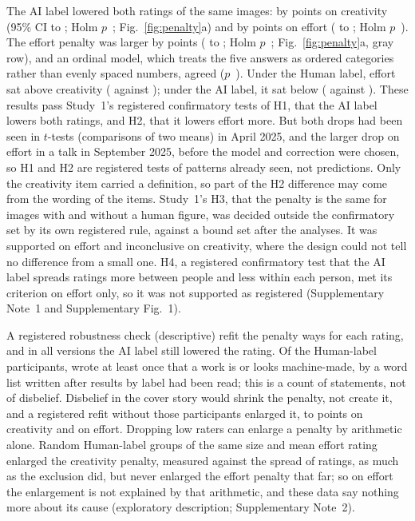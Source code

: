 The AI label lowered both ratings of the same images: by \SOneHOneCreatDiff{} points on creativity (95\% CI \SOneHOneCreatLo{} to \SOneHOneCreatHi; Holm $p$~\SOneHOneCreatPHolm; Fig.~\ref{fig:penalty}a) and by \SOneHOneEffDiff{} points on effort (\SOneHOneEffLo{} to \SOneHOneEffHi; Holm $p$~\SOneHOneEffPHolm). The effort penalty was larger by \SOneHTwoDiff{} points (\SOneHTwoLo{} to \SOneHTwoHi; Holm $p$~\SOneHTwoPHolm; Fig.~\ref{fig:penalty}a, gray row), and an ordinal model, which treats the five answers as ordered categories rather than evenly spaced numbers, agreed ($p$~\SOneHTwoOrdP). Under the Human label, effort sat above creativity (\SOneMeanHumanEff{} against \SOneMeanHumanCreat); under the AI label, it sat below (\SOneMeanAIEff{} against \SOneMeanAICreat). These results pass Study~1's registered confirmatory tests of H1, that the AI label lowers both ratings, and H2, that it lowers effort more. But both drops had been seen in $t$-tests (comparisons of two means) in April 2025, and the larger drop on effort in a talk in September 2025, before the model and correction were chosen, so H1 and H2 are registered tests of patterns already seen, not predictions. Only the creativity item carried a definition, so part of the H2 difference may come from the wording of the items. Study~1's H3, that the penalty is the same for images with and without a human figure, was decided outside the confirmatory set by its own registered rule, against a bound set after the analyses. It was supported on effort and inconclusive on creativity, where the design could not tell no difference from a small one. H4, a registered confirmatory test that the AI label spreads ratings more between people and less within each person, met its criterion on effort only, so it was not supported as registered (Supplementary Note~1 and Supplementary Fig.~1).

A registered robustness check (descriptive) refit the penalty \SOneSpecN{} ways for each rating, and in all \SOneSpecNTotal{} versions the AI label still lowered the rating. Of the \SOneBeliefNHuman{} Human-label participants, \SOneBeliefNarrowN{} wrote at least once that a work is or looks machine-made, by a word list written after results by label had been read; this is a count of statements, not of disbelief. Disbelief in the cover story would shrink the penalty, not create it, and a registered refit without those participants enlarged it, to \SOneBeliefRefitCreatDiff{} points on creativity and \SOneBeliefRefitEffDiff{} on effort. Dropping low raters can enlarge a penalty by arithmetic alone. Random Human-label groups of the same size and mean effort rating enlarged the creativity penalty, measured against the spread of ratings, as much as the exclusion did, but never enlarged the effort penalty that far; so on effort the enlargement is not explained by that arithmetic, and these data say nothing more about its cause (exploratory description; Supplementary Note~2).

